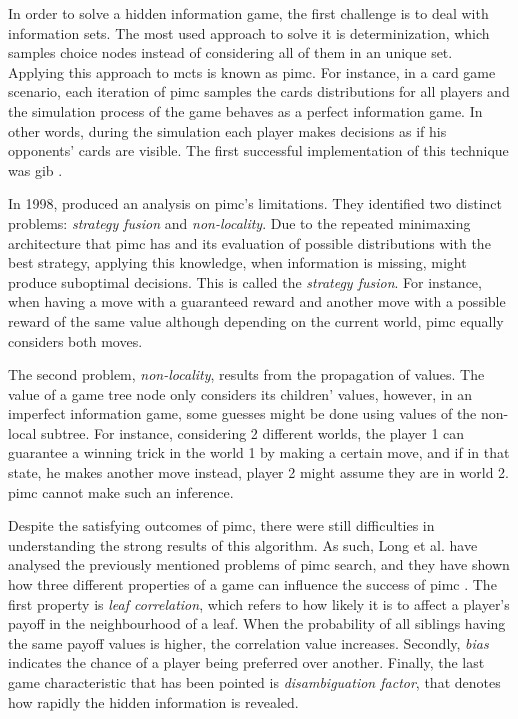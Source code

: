 In order to solve a hidden information game, the first challenge is to deal with information sets.
The most used approach to solve it is determinization, which samples choice nodes instead of considering all of them in an unique set.
Applying this approach to \ac{mcts} is known as \ac{pimc}.
For instance, in a card game scenario, each iteration of \ac{pimc} samples the cards distributions for all players and the simulation process of the game behaves as a perfect information game.
In other words, during the simulation each player makes decisions as if his opponents' cards are visible.
The first successful implementation of this technique was \ac{gib} \cite{Ginsberg2001}.


In 1998, \citet*{Frank1998} produced an analysis on \ac{pimc}'s limitations.
They identified two distinct problems: \emph{strategy fusion} and \emph{non-locality}.
Due to the repeated minimaxing architecture that \ac{pimc} has and its evaluation of possible distributions with the best strategy, applying this knowledge, when information is missing, might produce suboptimal decisions.
This is called the \emph{strategy fusion}.
For instance, when having a move with a guaranteed reward and another move with a possible reward of the same value although depending on the current world, \ac{pimc} equally considers both moves.


The second problem, \emph{non-locality}, results from the propagation of values.
The value of a game tree node only considers its children' values, however, in an imperfect information game, some guesses might be done using values of the non-local subtree.
For instance, considering 2 different worlds, the player 1 can guarantee a winning trick in the world 1 by making a certain move, and if in that state, he makes another move instead, player 2 might assume they are in world 2.
\ac{pimc} cannot make such an inference.


Despite the satisfying outcomes of \ac{pimc}, there were still difficulties in understanding the strong results of this algorithm.
As such, Long et al. have analysed the previously mentioned problems of \ac{pimc} search, and they have shown how three different properties of a game can influence the success of \ac{pimc} \cite{Long2010}.
The first property is \emph{leaf correlation}, which refers to how likely it is to affect a player's payoff in the neighbourhood of a leaf.
When the probability of all siblings having the same payoff values is higher, the correlation value increases.
Secondly, \emph{bias} indicates the chance of a player being preferred over another.
Finally, the last game characteristic that has been pointed is \emph{disambiguation factor}, that denotes how rapidly the hidden information is revealed.


